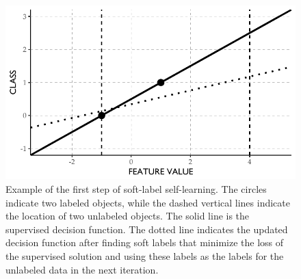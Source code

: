 \documentclass[twoside]{memoir}\usepackage[]{graphicx}\usepackage{xcolor}
\makeatletter
\def\maxwidth{ %
  \ifdim\Gin@nat@width>\linewidth
    \linewidth
  \else
    \Gin@nat@width
  \fi
}
\newenvironment{knitrout}{}{} %
\makeatother
\begin{document}
\begin{knitrout}
\color{fgcolor}\begin{figure}
\includegraphics[width=\maxwidth]{figure/simple-example-1} \caption[Example of the first step of soft-label self-learning]{Example of the first step of soft-label self-learning. The circles indicate two labeled objects, while the dashed vertical lines indicate the location of two unlabeled objects. The solid line is the supervised decision function. The dotted line indicates the updated decision function after finding soft labels that minimize the loss of the supervised solution and using these labels as the labels for the unlabeled data in the next iteration.}\label{fig:simple-example}
\end{figure}


\end{knitrout}
 
\end{document}
